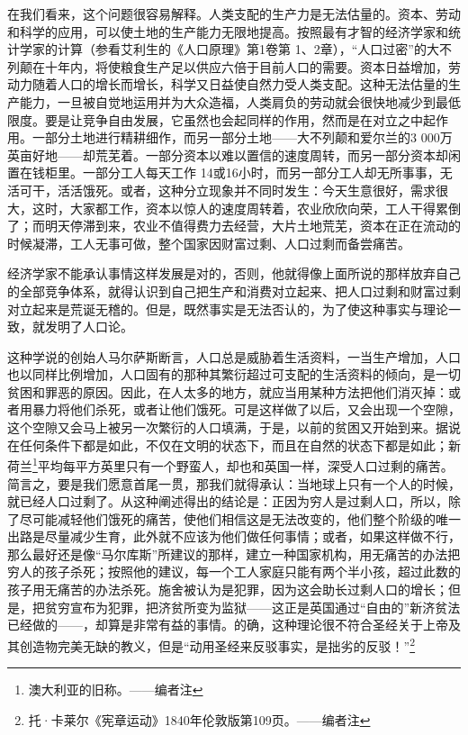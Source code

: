 \documentclass[a4paper,twoside,12pt,AutoFakeBold]{ctexart}
\begin{document}
在我们看来，这个问题很容易解释。人类支配的生产力是无法估量的。资本、劳动和科学的应用，可以使土地的生产能力无限地提高。按照最有才智的经济学家和统计学家的计算（参看艾利生的《人口原理》第1卷第 1、2章），“人口过密”的大不列颠在十年内，将使粮食生产足以供应六倍于目前人口的需要。资本日益增加，劳动力随着人口的增长而增长，科学又日益使自然力受人类支配。这种无法估量的生产能力，一旦被自觉地运用并为大众造福，人类肩负的劳动就会很快地减少到最低限度。要是让竞争自由发展，它虽然也会起同样的作用，然而是在对立之中起作用。一部分土地进行精耕细作，而另一部分土地——大不列颠和爱尔兰的3 000万英亩好地——却荒芜着。一部分资本以难以置信的速度周转，而另一部分资本却闲置在钱柜里。一部分工人每天工作 14或16小时，而另一部分工人却无所事事，无活可干，活活饿死。或者，这种分立现象并不同时发生：今天生意很好，需求很大，这时，大家都工作，资本以惊人的速度周转着，农业欣欣向荣，工人干得累倒了；而明天停滞到来，农业不值得费力去经营，大片土地荒芜，资本在正在流动的时候凝滞，工人无事可做，整个国家因财富过剩、人口过剩而备尝痛苦。

经济学家不能承认事情这样发展是对的，否则，他就得像上面所说的那样放弃自己的全部竞争体系，就得认识到自己把生产和消费对立起来、把人口过剩和财富过剩对立起来是荒诞无稽的。但是，既然事实是无法否认的，为了使这种事实与理论一致，就发明了人口论。

这种学说的创始人马尔萨斯断言，人口总是威胁着生活资料，一当生产增加，人口也以同样比例增加，人口固有的那种其繁衍超过可支配的生活资料的倾向，是一切贫困和罪恶的原因。因此，在人太多的地方，就应当用某种方法把他们消灭掉：或者用暴力将他们杀死，或者让他们饿死。可是这样做了以后，又会出现一个空隙，这个空隙又会马上被另一次繁衍的人口填满，于是，以前的贫困又开始到来。据说在任何条件下都是如此，不仅在文明的状态下，而且在自然的状态下都是如此；新荷兰\footnote{澳大利亚的旧称。——编者注}平均每平方英里只有一个野蛮人，却也和英国一样，深受人口过剩的痛苦。简言之，要是我们愿意首尾一贯，那我们就得承认：当地球上只有一个人的时候，就已经人口过剩了。从这种阐述得出的结论是：正因为穷人是过剩人口，所以，除了尽可能减轻他们饿死的痛苦，使他们相信这是无法改变的，他们整个阶级的唯一出路是尽量减少生育，此外就不应该为他们做任何事情；或者，如果这样做不行，那么最好还是像“马尔库斯”所建议的那样，建立一种国家机构，用无痛苦的办法把穷人的孩子杀死；按照他的建议，每一个工人家庭只能有两个半小孩，超过此数的孩子用无痛苦的办法杀死。施舍被认为是犯罪，因为这会助长过剩人口的增长；但是，把贫穷宣布为犯罪，把济贫所变为监狱——这正是英国通过“自由的”新济贫法已经做的——，却算是非常有益的事情。的确，这种理论很不符合圣经关于上帝及其创造物完美无缺的教义，但是“动用圣经来反驳事实，是拙劣的反驳！”\footnote{托·卡莱尔《宪章运动》1840年伦敦版第109页。——编者注}
\end{document}
